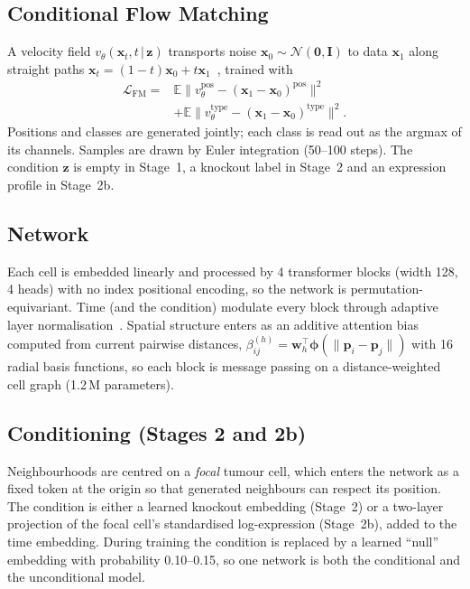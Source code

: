 \documentclass[journal]{IEEEtran}
\newcommand{\vtheta}{v_\theta}
\newcommand{\E}{\mathbb{E}}
\begin{document}
\subsection{Conditional Flow Matching}
A velocity field $\vtheta(\mathbf{x}_t, t \,|\, \mathbf{z})$ transports noise $\mathbf{x}_0\sim\mathcal{N}(\mathbf{0},\mathbf{I})$ to data $\mathbf{x}_1$ along straight paths $\mathbf{x}_t=(1-t)\mathbf{x}_0+t\mathbf{x}_1$~\cite{lipman2023,liu2023}, trained with
\begin{equation}
\begin{split}
\mathcal{L}_{\mathrm{FM}} = {}& \E\big\|\vtheta^{\mathrm{pos}} - (\mathbf{x}_1-\mathbf{x}_0)^{\mathrm{pos}}\big\|^2 \\
&+ \E\big\|\vtheta^{\mathrm{type}} - (\mathbf{x}_1-\mathbf{x}_0)^{\mathrm{type}}\big\|^2.
\end{split}
\end{equation}
Positions and classes are generated jointly; each class is read out as the argmax of its channels. Samples are drawn by Euler integration (50--100 steps). The condition $\mathbf{z}$ is empty in Stage~1, a knockout label in Stage~2 and an expression profile in Stage~2b.

\subsection{Network}
Each cell is embedded linearly and processed by 4 transformer blocks (width 128, 4 heads) with no index positional encoding, so the network is permutation-equivariant. Time (and the condition) modulate every block through adaptive layer normalisation~\cite{peebles2023}. Spatial structure enters as an additive attention bias computed from current pairwise distances, $\beta^{(h)}_{ij} = \mathbf{w}_h^{\top}\boldsymbol{\phi}(\|\mathbf{p}_i-\mathbf{p}_j\|)$ with 16 radial basis functions, so each block is message passing on a distance-weighted cell graph (1.2\,M parameters).

\subsection{Conditioning (Stages 2 and 2b)}
Neighbourhoods are centred on a \emph{focal} tumour cell, which enters the network as a fixed token at the origin so that generated neighbours can respect its position. The condition is either a learned knockout embedding (Stage~2) or a two-layer projection of the focal cell's standardised log-expression (Stage~2b), added to the time embedding. During training the condition is replaced by a learned ``null'' embedding with probability 0.10--0.15, so one network is both the conditional and the unconditional model.
\end{document}
